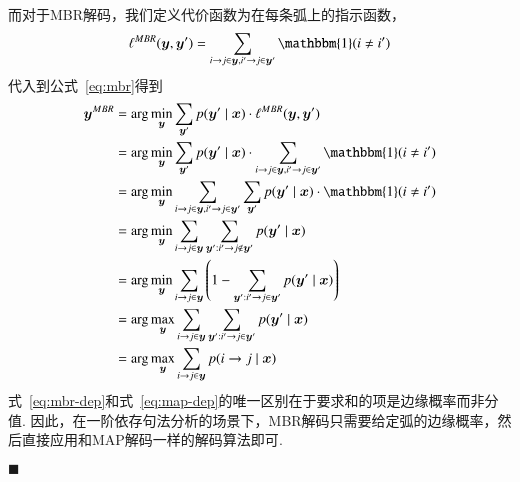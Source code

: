 而对于MBR解码，我们定义代价函数为在每条弧上的指示函数，
\begin{equation}
  \ell^{MBR}(\boldsymbol{y},\boldsymbol{y}^{\prime}) = \sum_{i\rightarrow j\in\boldsymbol{y},i^{\prime}\rightarrow j\in\boldsymbol{y}^{\prime}}\mathbbm{1}(i\neq i^{\prime})
\end{equation}
代入到公式~\ref{eq:mbr}得到
\begin{equation}
  \label{eq:mbr-dep}
  \begin{split}
    \boldsymbol{y}^{MBR}&= \arg\min_{\boldsymbol{y}}\sum_{\boldsymbol{y}^{\prime}}p(\boldsymbol{y}^{\prime}\mid\boldsymbol{x})\cdot\ell^{MBR}(\boldsymbol{y},\boldsymbol{y}^{\prime})\\
    &=\arg\min_{\boldsymbol{y}}\sum_{\boldsymbol{y}^{\prime}}p(\boldsymbol{y}^{\prime}\mid\boldsymbol{x})\cdot\sum_{i\rightarrow j\in\boldsymbol{y},i^{\prime}\rightarrow j\in\boldsymbol{y}^{\prime}}\mathbbm{1}(i\neq i^{\prime})\\
    &=\arg\min_{\boldsymbol{y}}\sum_{i\rightarrow j\in\boldsymbol{y},i^{\prime}\rightarrow j\in\boldsymbol{y}^{\prime}}\sum_{\boldsymbol{y}^{\prime}}p(\boldsymbol{y}^{\prime}\mid\boldsymbol{x})\cdot\mathbbm{1}(i\neq i^{\prime})\\
    &=\arg\min_{\boldsymbol{y}}\sum_{i\rightarrow j\in\boldsymbol{y}}\sum_{\boldsymbol{y}^{\prime}:i^{\prime}\rightarrow j\notin \boldsymbol{y}^{\prime}}p(\boldsymbol{y}^{\prime}\mid\boldsymbol{x})\\
    &=\arg\min_{\boldsymbol{y}}\sum_{i\rightarrow j\in\boldsymbol{y}}\left(1-\sum_{\boldsymbol{y}^{\prime}:i^{\prime}\rightarrow j\in \boldsymbol{y}^{\prime}}p(\boldsymbol{y}^{\prime}\mid\boldsymbol{x})\right)\\
    &=\arg\max_{\boldsymbol{y}}\sum_{i\rightarrow j\in\boldsymbol{y}}\sum_{\boldsymbol{y}^{\prime}:i^{\prime}\rightarrow j\in \boldsymbol{y}^{\prime}}p(\boldsymbol{y}^{\prime}\mid\boldsymbol{x})\\
    &=\arg\max_{\boldsymbol{y}}\sum_{i\rightarrow j\in\boldsymbol{y}}p(i\rightarrow j\mid\boldsymbol{x})
  \end{split}
\end{equation}
式~\ref{eq:mbr-dep}和式~\ref{eq:map-dep}的唯一区别在于要求和的项是边缘概率而非分值.
因此，在一阶依存句法分析的场景下，MBR解码只需要给定弧的边缘概率，然后直接应用和MAP解码一样的解码算法即可\citep{smith-smith-2007-probabilistic, smith-2011-linguistic}.

\noindent$\blacksquare$

